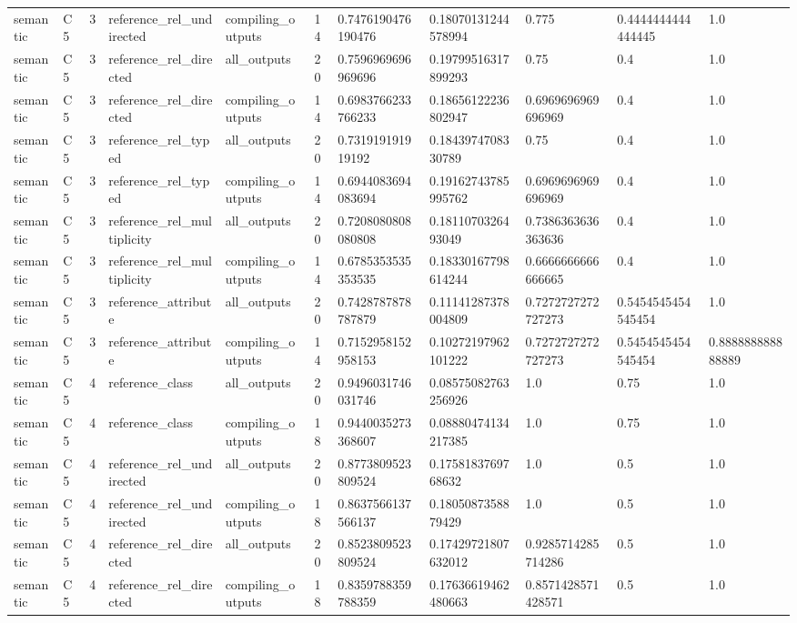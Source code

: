 \begin{tabular}{lllllllllll}
semantic & C5 & 3 & reference\_rel\_undirected & compiling\_outputs & 14 & 0.7476190476190476 & 0.18070131244578994 & 0.775 & 0.4444444444444445 & 1.0 \\
semantic & C5 & 3 & reference\_rel\_directed & all\_outputs & 20 & 0.7596969696969696 & 0.19799516317899293 & 0.75 & 0.4 & 1.0 \\
semantic & C5 & 3 & reference\_rel\_directed & compiling\_outputs & 14 & 0.6983766233766233 & 0.18656122236802947 & 0.6969696969696969 & 0.4 & 1.0 \\
semantic & C5 & 3 & reference\_rel\_typed & all\_outputs & 20 & 0.731919191919192 & 0.1843974708330789 & 0.75 & 0.4 & 1.0 \\
semantic & C5 & 3 & reference\_rel\_typed & compiling\_outputs & 14 & 0.6944083694083694 & 0.19162743785995762 & 0.6969696969696969 & 0.4 & 1.0 \\
semantic & C5 & 3 & reference\_rel\_multiplicity & all\_outputs & 20 & 0.7208080808080808 & 0.1811070326493049 & 0.7386363636363636 & 0.4 & 1.0 \\
semantic & C5 & 3 & reference\_rel\_multiplicity & compiling\_outputs & 14 & 0.6785353535353535 & 0.18330167798614244 & 0.6666666666666665 & 0.4 & 1.0 \\
semantic & C5 & 3 & reference\_attribute & all\_outputs & 20 & 0.7428787878787879 & 0.11141287378004809 & 0.7272727272727273 & 0.5454545454545454 & 1.0 \\
semantic & C5 & 3 & reference\_attribute & compiling\_outputs & 14 & 0.7152958152958153 & 0.10272197962101222 & 0.7272727272727273 & 0.5454545454545454 & 0.888888888888889 \\
semantic & C5 & 4 & reference\_class & all\_outputs & 20 & 0.9496031746031746 & 0.08575082763256926 & 1.0 & 0.75 & 1.0 \\
semantic & C5 & 4 & reference\_class & compiling\_outputs & 18 & 0.9440035273368607 & 0.08880474134217385 & 1.0 & 0.75 & 1.0 \\
semantic & C5 & 4 & reference\_rel\_undirected & all\_outputs & 20 & 0.8773809523809524 & 0.1758183769768632 & 1.0 & 0.5 & 1.0 \\
semantic & C5 & 4 & reference\_rel\_undirected & compiling\_outputs & 18 & 0.8637566137566137 & 0.1805087358879429 & 1.0 & 0.5 & 1.0 \\
semantic & C5 & 4 & reference\_rel\_directed & all\_outputs & 20 & 0.8523809523809524 & 0.17429721807632012 & 0.9285714285714286 & 0.5 & 1.0 \\
semantic & C5 & 4 & reference\_rel\_directed & compiling\_outputs & 18 & 0.8359788359788359 & 0.17636619462480663 & 0.8571428571428571 & 0.5 & 1.0 \\

\end{tabular}
